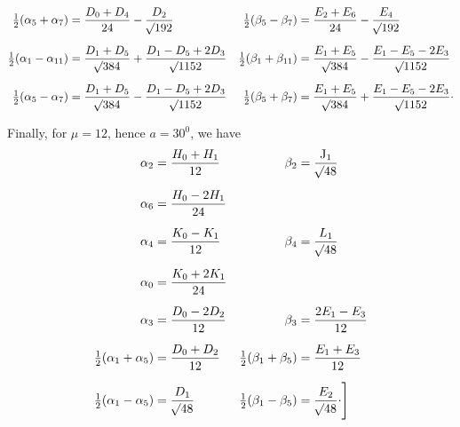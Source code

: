 \begin{landscape}
\[\begin{aligned}
\tfrac12(\alpha_5+\alpha_7)&=\frac{D_0+D_4}{24}-\frac{D_2}{\BareRoot{192}}&\tfrac12(\beta_5-\beta_7)&=\frac{E_2+E_6}{24}-\frac{E_4}{\BareRoot{192}}\\[6pt]
\tfrac12(\alpha_1-\alpha_{11})&=\frac{D_1+D_5}{\BareRoot{384}}+\frac{D_1-D_5+2D_3}{\BareRoot{1152}}&\tfrac12(\beta_1+\beta_{11})&=\frac{E_1+E_5}{\BareRoot{384}}-\frac{E_1-E_5-2E_3}{\BareRoot{1152}}\\[6pt]
\tfrac12(\alpha_5-\alpha_7)&=\frac{D_1+D_5}{\BareRoot{384}}-\frac{D_1-D_5+2D_3}{\BareRoot{1152}}&\tfrac12(\beta_5+\beta_7)&=\frac{E_1+E_5}{\BareRoot{384}}+\frac{E_1-E_5-2E_3}{\BareRoot{1152}}\VthreeRaisedPoint
\end{aligned}
\]
\clearpage{}
\par\noindent\hspace*{\parindent}Finally, for \(\mu=12\), hence \(a=30^0\), we have
\[
\begin{aligned}
\alpha_2&=\frac{H_0+H_1}{12}&\qquad\beta_2&=\frac{\mathrm{J}_1}{\BareRoot{48}}\\[6pt]
\alpha_6&=\frac{H_0-2H_1}{24}&&\\[6pt]
\alpha_4&=\frac{K_0-K_1}{12}&\beta_4&=\frac{L_1}{\BareRoot{48}}\\[6pt]
\alpha_0&=\frac{K_0+2K_1}{24}&&\\[6pt]
\alpha_3&=\frac{D_0-2D_2}{12}&\beta_3&=\frac{2E_1-E_3}{12}\VthreeFractionLowPoint\\[6pt]
\tfrac12(\alpha_1+\alpha_5)&=\frac{D_0+D_2}{12}&\tfrac12(\beta_1+\beta_5)&=\frac{E_1+E_3}{12}\\[6pt]
\tfrac12(\alpha_1-\alpha_5)&=\frac{D_1}{\BareRoot{48}}&\tfrac12(\beta_1-\beta_5)&=\frac{E_2}{\BareRoot{48}}\VthreeRaisedPoint\Bigg]
\end{aligned}
\]
\clearpage
\endgroup
\end{landscape}
